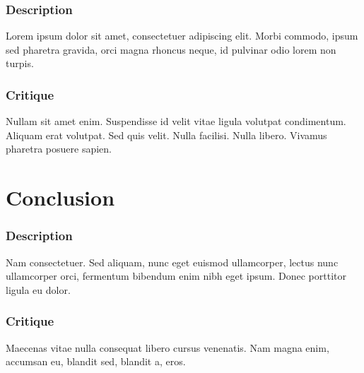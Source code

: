 \documentclass[10pt]{article}
\begin{document}
\begin{multicols}{2}
\subsubsection*{Description}
Lorem ipsum dolor sit amet, consectetuer adipiscing elit. Morbi commodo, ipsum sed pharetra gravida, orci magna rhoncus neque, id pulvinar odio lorem non turpis. 

\subsubsection*{Critique}
Nullam sit amet enim. Suspendisse id velit vitae ligula volutpat condimentum. Aliquam erat volutpat. Sed quis velit. Nulla facilisi. Nulla libero. Vivamus pharetra posuere sapien. 

\section*{Conclusion}
\subsubsection*{Description}
Nam consectetuer. Sed aliquam, nunc eget euismod ullamcorper, lectus nunc ullamcorper orci, fermentum bibendum enim nibh eget ipsum. Donec porttitor ligula eu dolor. 

\subsubsection*{Critique}
Maecenas vitae nulla consequat libero cursus venenatis. Nam magna enim, accumsan eu, blandit sed, blandit a, eros.

\end{multicols}

\newpage
\end{document}

